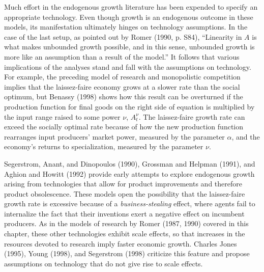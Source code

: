 Much effort in the endogenous growth literature has been expended to specify an appropriate
 technology. Even though growth is an endogenous outcome
in these models, its manifestation  ultimately hinges on technology assumptions.
In the case of the last setup, as pointed out by Romer (1990, p. S84),
%
``Linearity in $A$ is what makes unbounded growth possible, and in this sense,
unbounded growth is more like an assumption than a result of the model.''
It follows that various implications of the analyses stand and fall with the
assumptions on technology. For example, the preceding
model of research and monopolistic
competition implies that the laissez-faire economy grows at a slower rate
than the social optimum, but Benassy (1998)
%
 shows how this result can be overturned
if the production function for final goods on the right side
of equation
 is multiplied by the input range raised to some power $\nu$,
$A_t^\nu$. The laissez-faire growth rate can exceed
the socially optimal rate because of how the new production function rearranges input
producers' market power, measured by the parameter $\alpha$, and the economy's
returns to specialization, measured by the parameter $\nu$.

  
  
Segerstrom, Anant, and Dinopoulos (1990), Grossman and Helpman (1991), and
Aghion and Howitt (1992)
provide early attempts to explore endogenous growth arising from technologies
that allow for product improvements and therefore product obsolescence.
These models open the possibility that the laissez-faire growth rate is
excessive because of a {\it business-stealing\/} effect, where agents
\newpage \noindent fail to
internalize the fact that their inventions exert a negative effect on incumbent
producers. As in the models of research by Romer (1987, 1990)
%
 covered in this chapter, these other technologies exhibit scale effects, so
that increases in the resources devoted to research imply faster economic growth.
Charles  Jones (1995), Young (1998), and Segerstrom (1998) criticize this feature
and propose assumptions on technology that do not give rise to scale effects.
  

\showchaptIDfalse
\showsectIDfalse
